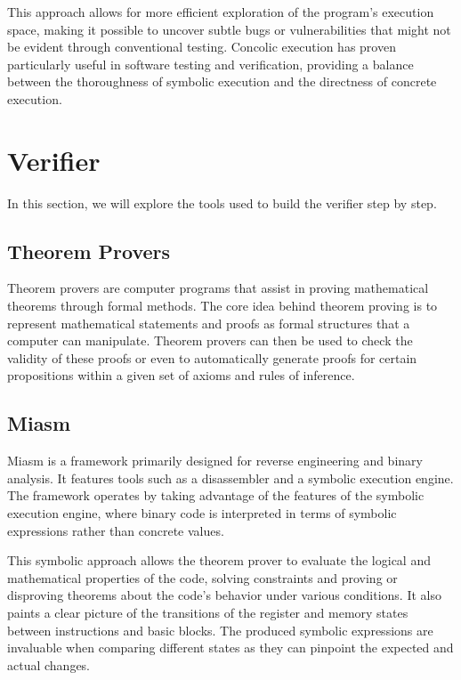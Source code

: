 This approach allows for more efficient exploration of the program's execution space, making it possible to uncover subtle bugs or vulnerabilities that might not be evident through conventional testing. 
Concolic execution has proven particularly useful in software testing and verification, providing a balance between the thoroughness of symbolic execution and the directness of concrete execution.

\section{Verifier}
In this section, we will explore the tools used to build the verifier step by step.

\subsection{Theorem Provers}
Theorem provers are computer programs that assist in proving mathematical theorems through formal methods.
The core idea behind theorem proving is to represent mathematical statements and proofs as formal structures that a computer can manipulate.
Theorem provers can then be used to check the validity of these proofs or even to automatically generate proofs for certain propositions within a given set of axioms and rules of inference.

\subsection{Miasm}
Miasm \cite{desclaux2012miasm} is a framework primarily designed for reverse engineering and binary analysis.
It features tools such as a disassembler and a symbolic execution engine.
The framework operates by taking advantage of the features of the symbolic execution engine, where binary code is interpreted in terms of symbolic expressions rather than concrete values.

This symbolic approach allows the theorem prover to evaluate the logical and mathematical properties of the code, solving constraints and proving or disproving theorems about the code's behavior under various conditions.
It also paints a clear picture of the transitions of the register and memory states between instructions and basic blocks.
The produced symbolic expressions are invaluable when comparing different states as they can pinpoint the expected and actual changes.

